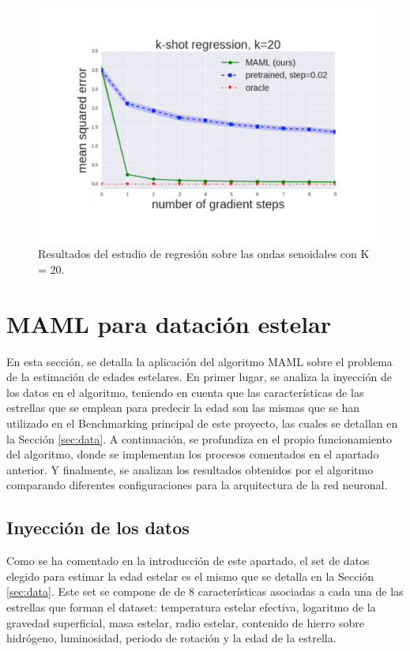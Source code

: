 \begin{figure}[H]
\begin{center}
 \includegraphics[width=0.8\linewidth]{Figuras/MAML/sinusoid_3.pdf}
\end{center}
\caption{Resultados del estudio de regresión sobre las ondas senoidales con K = 20.}
 \label{fig:sinusoid_results_3}
\end{figure}

\section{MAML para datación estelar}
\label{sec:maml}

En esta sección, se detalla la aplicación del algoritmo MAML sobre el problema de la estimación de edades estelares. En primer lugar, se analiza la inyección de los datos en el algoritmo, teniendo en cuenta que las características de las estrellas que se emplean para predecir la edad son las mismas que se han utilizado en el Benchmarking principal de este proyecto, las cuales se detallan en la Sección \ref{sec:data}. A continuación, se profundiza en el propio funcionamiento del algoritmo, donde se implementan los procesos comentados en el apartado anterior. Y finalmente, se analizan los resultados obtenidos por el algoritmo comparando diferentes configuraciones para la arquitectura de la red neuronal.

\subsection{Inyección de los datos} 

Como se ha comentado en la introducción de este apartado, el set de datos elegido para estimar la edad estelar es el mismo que se detalla en la Sección \ref{sec:data}. Este set se compone de de 8 características asociadas a cada una de las estrellas que forman el dataset: temperatura estelar efectiva, logaritmo de la gravedad superficial, masa estelar, radio estelar, contenido de hierro sobre hidrógeno, luminosidad, periodo de rotación y la edad de la estrella.

